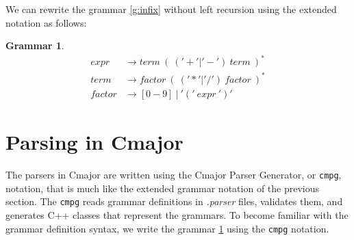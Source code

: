 \documentclass[a4paper,oneside,11pt]{book}
\theoremstyle{definition}
\newtheorem{grmr}{Grammar}[section]
\begin{document}
We can rewrite the grammar \ref{g:infix} without left recursion using the extended notation as follows:

\begin{grmr}\label{g:expr}
\begin{align*}
expr &\rightarrow term \>(\>('+'|'-')\> term \>)^*\\
term &\rightarrow factor \>(\>('*'|'/')\> factor \>)^*\\
factor &\rightarrow [0-9] \> |\> '('\> expr \> ')'
\end{align*}
\end{grmr}

\section{Parsing in Cmajor}

The parsers in Cmajor are written using the Cmajor Parser Generator, or \verb|cmpg|, notation,
that is much like the extended grammar notation of the previous section.
The \verb|cmpg| reads grammar definitions in \emph{.parser} files, validates them,
and generates C++ classes that represent the grammars. To become familiar with the grammar definition syntax,
we write the grammar \ref{g:expr} using the \verb|cmpg| notation.
\end{document}

